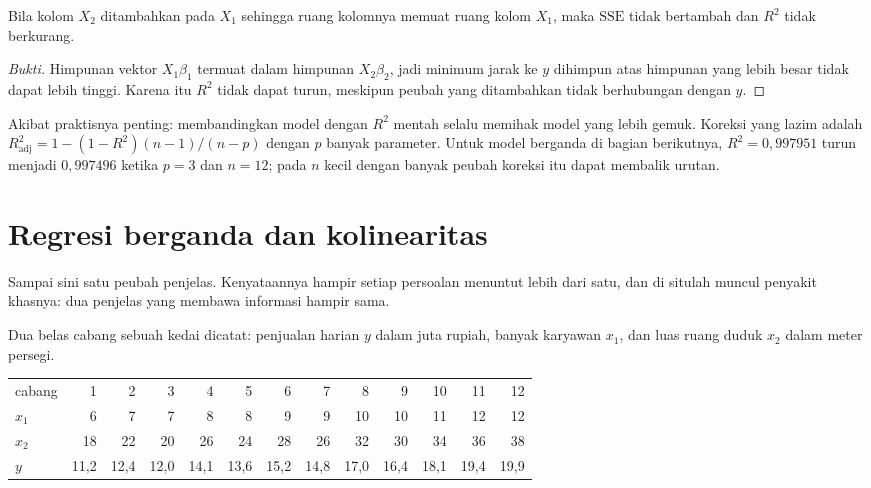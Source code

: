 \begin{proposisi}
Bila kolom $X_2$ ditambahkan pada $X_1$ sehingga ruang kolomnya memuat ruang kolom
$X_1$, maka $\mathrm{SSE}$ tidak bertambah dan $R^2$ tidak berkurang.
\end{proposisi}

\begin{proof}[Bukti]
Himpunan vektor $X_1\beta_1$ termuat dalam himpunan $X_2\beta_2$, jadi minimum jarak
ke $y$ dihimpun atas himpunan yang lebih besar tidak dapat lebih tinggi. Karena itu
$R^2$ tidak dapat turun, meskipun peubah yang ditambahkan tidak berhubungan dengan $y$.
\end{proof}

Akibat praktisnya penting: membandingkan model dengan $R^2$ mentah selalu memihak model
yang lebih gemuk. Koreksi yang lazim adalah
$R^2_{\text{adj}}=1-(1-R^2)(n-1)/(n-p)$ dengan $p$ banyak parameter. Untuk model
berganda di bagian berikutnya, $R^2=0{,}997951$ turun menjadi $0{,}997496$ ketika $p=3$
dan $n=12$; pada $n$ kecil dengan banyak peubah koreksi itu dapat membalik urutan.

\section{Regresi berganda dan kolinearitas}

Sampai sini satu peubah penjelas. Kenyataannya hampir setiap persoalan menuntut lebih
dari satu, dan di situlah muncul penyakit khasnya: dua penjelas yang membawa informasi
hampir sama.

Dua belas cabang sebuah kedai dicatat: penjualan harian $y$ dalam juta rupiah, banyak
karyawan $x_1$, dan luas ruang duduk $x_2$ dalam meter persegi.

\begin{center}
\small
\begin{tabular}{l*{12}{r}}
\hline
cabang   & 1 & 2 & 3 & 4 & 5 & 6 & 7 & 8 & 9 & 10 & 11 & 12 \\
$x_1$    & 6 & 7 & 7 & 8 & 8 & 9 & 9 & 10 & 10 & 11 & 12 & 12 \\
$x_2$    & 18 & 22 & 20 & 26 & 24 & 28 & 26 & 32 & 30 & 34 & 36 & 38 \\
$y$      & 11,2 & 12,4 & 12,0 & 14,1 & 13,6 & 15,2 & 14,8 & 17,0 & 16,4 & 18,1 & 19,4 & 19,9 \\
\hline
\end{tabular}
\end{center}

